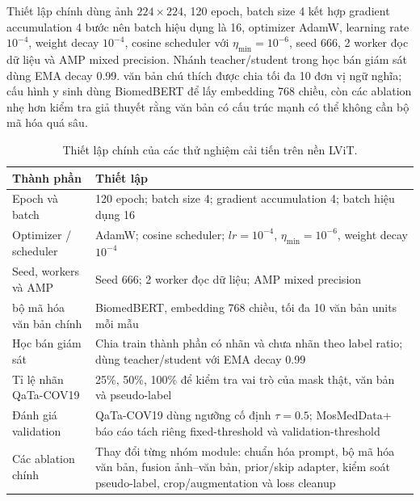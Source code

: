 Thiết lập chính dùng ảnh \(224\times224\), 120 epoch, batch size 4 kết hợp gradient accumulation 4 bước nên batch hiệu dụng là 16, optimizer AdamW, learning rate \(10^{-4}\), weight decay \(10^{-4}\), cosine scheduler với \(\eta_{\min}=10^{-6}\), seed 666, 2 worker đọc dữ liệu và AMP mixed precision. Nhánh teacher/student trong học bán giám sát dùng EMA decay 0.99. văn bản chú thích được chia tối đa 10 đơn vị ngữ nghĩa; cấu hình y sinh dùng BiomedBERT để lấy embedding 768 chiều, còn các ablation nhẹ hơn kiểm tra giả thuyết rằng văn bản có cấu trúc mạnh có thể không cần bộ mã hóa quá sâu.

\begin{table}[H]
  \centering
  \caption{Thiết lập chính của các thử nghiệm cải tiến trên nền LViT.}
  \label{tab:qatalvit-training-setup}
  \small
  \renewcommand{\arraystretch}{1.15}
  \setlength{\tabcolsep}{4pt}
  \begin{tabularx}{\textwidth}{@{}p{} Y@{}}
    \toprule
    Thành phần & Thiết lập \\
    \midrule
    Epoch và batch & 120 epoch; batch size 4; gradient accumulation 4; batch hiệu dụng 16 \\
    Optimizer / scheduler & AdamW; cosine scheduler; \(lr=10^{-4}\), \(\eta_{\min}=10^{-6}\), weight decay \(10^{-4}\) \\
    Seed, workers và AMP & Seed 666; 2 worker đọc dữ liệu; AMP mixed precision \\
    bộ mã hóa văn bản chính & BiomedBERT, embedding 768 chiều, tối đa 10 văn bản units mỗi mẫu \\
    Học bán giám sát & Chia train thành phần có nhãn và chưa nhãn theo label ratio; dùng teacher/student với EMA decay 0.99 \\
    Tỉ lệ nhãn QaTa-COV19 & 25\%, 50\%, 100\% để kiểm tra vai trò của mask thật, văn bản và pseudo-label \\
    Đánh giá validation & QaTa-COV19 dùng ngưỡng cố định \(\tau=0.5\); MosMedData+ báo cáo tách riêng fixed-threshold và validation-threshold \\
    Các ablation chính & Thay đổi từng nhóm module: chuẩn hóa prompt, bộ mã hóa văn bản, fusion ảnh--văn bản, prior/skip adapter, kiểm soát pseudo-label, crop/augmentation và loss cleanup \\
    \bottomrule
  \end{tabularx}
\end{table}
\FloatBarrier

